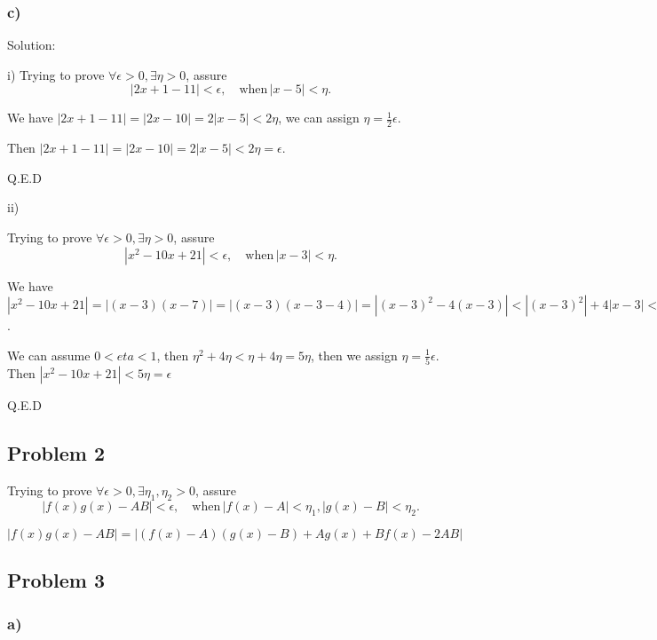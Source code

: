 \documentclass[letterpaper, 11pt]{article}
\newcommand{\1}{\mathds{1}}	%
\theoremstyle{definition}
\begin{document}
\subsubsection*{c)}

Solution:

i)
Trying to prove $ \forall \epsilon > 0, \exists \eta > 0$, assure \begin{equation*}
  |2x+1-11| < \epsilon,\quad \text{when}\, |x - 5| < \eta.
\end{equation*} 

We have $|2x+1-11| = |2x-10|=2|x-5| < 2 \eta $,
we can assign $\eta = \frac{1}{2} \epsilon$.

Then $|2x+1-11| = |2x-10|=2|x-5| < 2 \eta = \epsilon$.

Q.E.D

ii)

Trying to prove $ \forall \epsilon > 0, \exists \eta > 0$, assure \begin{equation*}
  |x^{2} - 10x + 21| < \epsilon,\quad \text{when}\, |x - 3| < \eta.
\end{equation*} 

We have $|x^{2} - 10x + 21| = |(x-3)(x-7)|=|(x-3)(x-3-4)| = |(x-3)^{2} - 4(x-3)| < |(x-3)^{2}| + 4 |x-3| < \eta ^{2} + 4 \eta $.

We can assume $0 < eta < 1$, then $\eta ^{2} + 4 \eta < \eta + 4\eta = 5\eta$, then we assign $\eta = \frac{1}{5}\epsilon$.
Then $|x^{2} - 10x + 21| < 5\eta = \epsilon$

Q.E.D

\subsection*{Problem 2}
Trying to prove $ \forall \epsilon > 0, \exists \eta_{1}, \eta_{2} > 0$, assure \begin{equation*}
  |f(x)g(x) - AB| < \epsilon,\quad \text{when}\, |f(x) - A| < \eta_{1} , |g(x) - B| < \eta_{2}.
\end{equation*}

$|f(x)g(x) - AB| = | (f(x) - A)(g(x) - B) + A g(x) + B f(x) - 2AB |$



\subsection*{Problem 3}

\subsubsection*{a)}
\end{document}
